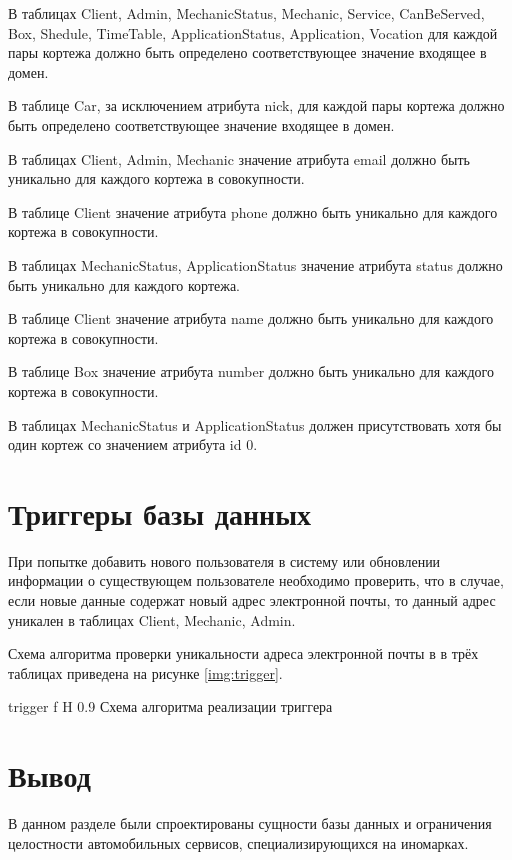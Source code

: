 В таблицах Client, Admin, MechanicStatus, Mechanic, Service, CanBeServed, Box, Shedule, TimeTable, ApplicationStatus, Application, Vocation для каждой пары кортежа должно быть определено соответствующее значение входящее в домен. 

В таблице Car, за исключением атрибута nick, для каждой пары кортежа должно быть определено соответствующее значение входящее в домен.

В таблицах Client, Admin, Mechanic значение атрибута email должно быть уникально для каждого кортежа в совокупности.

В таблице Client значение атрибута phone должно быть уникально для каждого кортежа в совокупности.

В таблицах MechanicStatus, ApplicationStatus значение атрибута status должно быть уникально для каждого кортежа.

В таблице Client значение атрибута name должно быть уникально для каждого кортежа в совокупности.

В таблице Box значение атрибута number должно быть уникально для каждого кортежа в совокупности.

В таблицах MechanicStatus и ApplicationStatus должен присутствовать хотя бы один кортеж со значением атрибута id 0. 

\section{Триггеры базы данных}

При попытке добавить нового пользователя в систему или обновлении информации о существующем пользователе необходимо проверить, что в случае, если новые данные содержат новый адрес электронной почты, то данный адрес уникален в таблицах Client, Mechanic, Admin.

Схема алгоритма проверки уникальности адреса электронной почты в в трёх таблицах приведена на рисунке \ref{img:trigger}.

{trigger}
{f}
{H}
{0.9\textwidth}
{Схема алгоритма реализации триггера}

\section*{Вывод}

В данном разделе были спроектированы сущности базы данных и ограничения целостности автомобильных сервисов, специализирующихся на иномарках.


 



